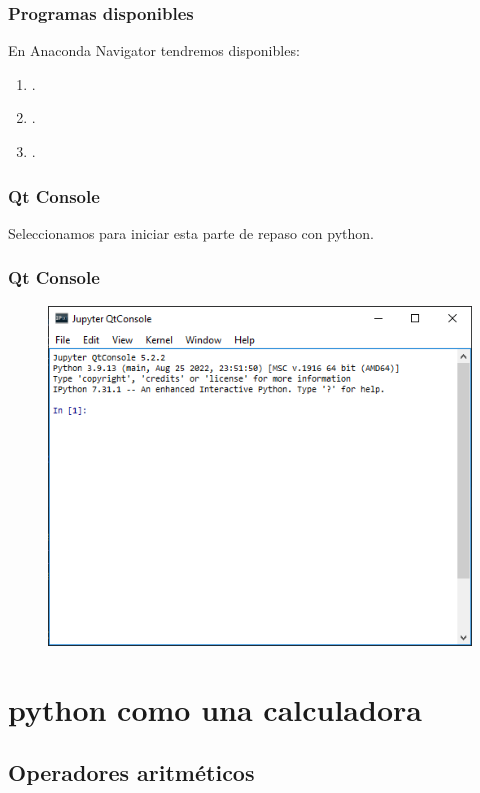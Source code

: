 \documentclass[12pt]{beamer}
\begin{document}
\begin{frame}
\frametitle{Programas disponibles}
En Anaconda Navigator tendremos disponibles:
\pause
{}
\begin{enumerate}[<+->]
\item {}.
\item {}.
\item {}.
\end{enumerate}
\end{frame}
\begin{frame}
\frametitle{Qt Console}
Seleccionamos  para iniciar esta parte de repaso con python.
\end{frame}
\begin{frame}
\frametitle{Qt Console}
\begin{figure}
    \centering
    \includegraphics[scale=0.65]{Imagenes/Anaconda_02.png}
\end{figure}
\end{frame}

\section{python como una calculadora}
\subsection{Operadores aritméticos}
\end{document}
